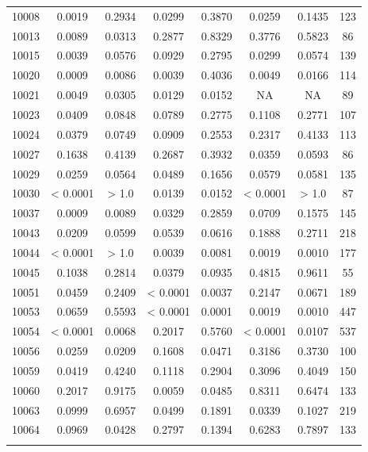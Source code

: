 \begin{table}[H]
{\begin{tabular}{cccccccc}
10008 & {\color{red}0.0019} & 0.2934 & {\color{red}0.0299} & 0.3870 & {\color{red}0.0259} & 0.1435 & 123 \\ 
10013 & {\color{red}0.0089} & {\color{red}0.0313} & 0.2877 & 0.8329 & 0.3776 & 0.5823 & 86 \\ 
10015 & {\color{red}0.0039} & 0.0576 & 0.0929 & 0.2795 & {\color{red}0.0299} & 0.0574 & 139 \\ 
10020 & {\color{red}0.0009} & {\color{red}0.0086} & {\color{red}0.0039} & 0.4036 & {\color{red}0.0049} & {\color{red}0.0166} & 114 \\ 
10021 & {\color{red}0.0049} & {\color{red}0.0305} & {\color{red}0.0129} & {\color{red}0.0152} & NA & NA & 89 \\ 
10023 & {\color{red}0.0409} & 0.0848 & 0.0789 & 0.2775 & 0.1108 & 0.2771 & 107 \\ 
10024 & {\color{red}0.0379} & 0.0749 & 0.0909 & 0.2553 & 0.2317 & 0.4133 & 113 \\ 
10027 & 0.1638 & 0.4139 & 0.2687 & 0.3932 & {\color{red}0.0359} & 0.0593 & 86 \\ 
10029 & {\color{red}0.0259} & 0.0564 & {\color{red}0.0489} & 0.1656 & 0.0579 & 0.0581 & 135 \\ 
10030 & {\color{red} < 0.0001} & > 1.0 & {\color{red}0.0139} & {\color{red}0.0152} & {\color{red} < 0.0001} & > 1.0 & 87 \\ 
10037 & {\color{red}0.0009} & {\color{red}0.0089} & {\color{red}0.0329} & 0.2859 & 0.0709 & 0.1575 & 145 \\ 
10043 & {\color{red}0.0209} & 0.0599 & 0.0539 & 0.0616 & 0.1888 & 0.2711 & 218 \\ 
10044 & {\color{red} < 0.0001} & > 1.0 & {\color{red}0.0039} & {\color{red}0.0081} & {\color{red}0.0019} & {\color{red}0.0010} & 177 \\ 
10045 & 0.1038 & 0.2814 & {\color{red}0.0379} & 0.0935 & 0.4815 & 0.9611 & 55 \\ 
10051 & {\color{red}0.0459} & 0.2409 & {\color{red} < 0.0001} & {\color{red}0.0037} & 0.2147 & 0.0671 & 189 \\ 
10053 & 0.0659 & 0.5593 & {\color{red} < 0.0001} & {\color{red}0.0001} & {\color{red}0.0019} & {\color{red}0.0010} & 447 \\ 
10054 & {\color{red} < 0.0001} & {\color{red}0.0068} & 0.2017 & 0.5760 & {\color{red} < 0.0001} & {\color{red}0.0107} & 537 \\ 
10056 & {\color{red}0.0259} & {\color{red}0.0209} & 0.1608 & {\color{red}0.0471} & 0.3186 & 0.3730 & 100 \\ 
10059 & {\color{red}0.0419} & 0.4240 & 0.1118 & 0.2904 & 0.3096 & 0.4049 & 150 \\ 
10060 & 0.2017 & 0.9175 & {\color{red}0.0059} & {\color{red}0.0485} & 0.8311 & 0.6474 & 133 \\ 
10063 & 0.0999 & 0.6957 & {\color{red}0.0499} & 0.1891 & {\color{red}0.0339} & 0.1027 & 219 \\ 
10064 & 0.0969 & {\color{red}0.0428} & 0.2797 & 0.1394 & 0.6283 & 0.7897 & 133 \\ \hline
\label{tab:nosocsI}
\end{tabular}
}
\end{table}

